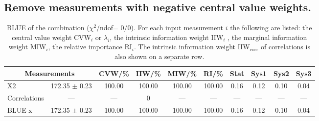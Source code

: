\subsection{Remove measurements with negative central value weights.}
\begin{table}[H]
\scriptsize
\begin{center}
\renewcommand{\arraystretch}{1.1}
\begin{tabular}{|lc|c|c|c|c|cccc|}
\hline
\multicolumn{2}{|c|}{Measurements} & CVW/\%  & IIW/\%  & MIW/\%  & RI/\%  & {\tiny Stat} & {\tiny Sys1} & {\tiny Sys2} & {\tiny Sys3}\\
\hline
X2 &     172.35 $\pm$       0.23 &     100.00 &     100.00 &     100.00 &     100.00 &       0.16 &       0.12 &       0.10 &       0.04\\
Correlations & --- & --- &  0 & --- & --- & --- & --- & --- & ---\\
\hline
BLUE {\tiny x} &     172.35 $\pm$       0.23 &     100.00 &     100.00 &     100.00 &     100.00 &       0.16 &       0.12 &       0.10 &       0.04\\
\hline
\end{tabular}
\caption{BLUE of the combination ($\chi^2$/ndof= 0/0).
 For each input measurement $i$ the following are listed: the central value weight CVW$_i$ or $\lambda_i$, the intrinsic information weight IIW$_i$ , the marginal information weight MIW$_i$, the relative importance RI$_i$. The intrinsic information weight IIW$_{\mathrm{corr}}$ of correlations is also shown on a separate row.}
\renewcommand{\arraystretch}{1}
\end{center}
\end{table}
